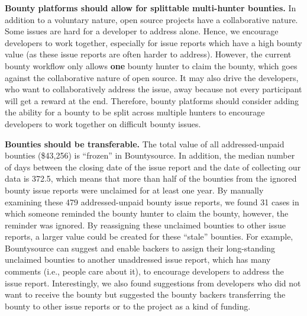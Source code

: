 \textbf{Bounty platforms should allow for splittable multi-hunter bounties.}
In addition to a voluntary nature, open source projects have a collaborative nature. Some issues are hard for a developer to address alone. Hence, we encourage developers to work together, especially for issue reports which have a high bounty value (as these issue reports are often harder to address).
However, the current bounty workflow only allows \textbf{one} bounty hunter to claim the bounty, which goes against the collaborative nature of open source. It may also drive the developers, who want to collaboratively address the issue, away because not every participant will get a reward at the end. Therefore, bounty platforms should consider adding the ability for a bounty to be split across multiple hunters to encourage developers to work together on difficult bounty issues.


\textbf{Bounties should be transferable.}
The total value of all addressed-unpaid bounties (\$43,256) is ``frozen'' in Bountysource. In addition, the median number of days between the closing date of the issue report and the date of collecting our data is 372.5,  which means that more than half of the bounties from the ignored bounty issue reports were unclaimed for at least one year. 
By manually examining these 479 addressed-unpaid bounty issue reports, we found 31 cases in which someone reminded the bounty hunter to claim the bounty, however, the reminder was ignored. By reassigning these unclaimed bounties to other issue reports, a larger value could be created for these ``stale'' bounties. For example, Bountysource can suggest and enable backers to assign their long-standing unclaimed bounties to another unaddressed issue report, which has many comments (i.e., people care about it), to encourage developers to address the issue report. Interestingly, we also found suggestions from developers who did not want to receive the bounty but suggested the bounty backers transferring the bounty to other issue reports or to the project as a kind of funding.




